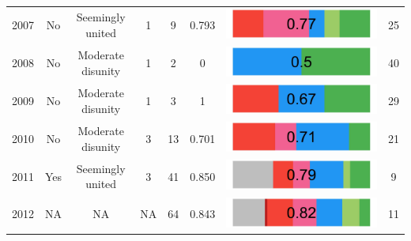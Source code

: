 \begin{landscape}
\begin{table}[!htbp]
\begin{tabular}{cccc|cccc}
2007  &     No      &                        Seemingly united   &                                      1 &                     9 &                     0.793  &        \includegraphics[width = 0.15\columnwidth]{img/ideo2007.jpg}   &         25   \\ 

2008  &     No    &                          Moderate disunity   &                                       1 &                    2 &                     0  &            \includegraphics[width = 0.15\columnwidth]{img/ideo2008.jpg} &           40  \\ 

2009  &     No      &                         Moderate disunity    &                                    1 &                     3 &                     1  &            \includegraphics[width = 0.15\columnwidth]{img/ideo2009.jpg}    &        29  \\ 

2010  &     No     &                          Moderate disunity  &                                      3 &                     13 &                    0.701  &         \includegraphics[width = 0.15\columnwidth]{img/ideo2010.jpg}  &         21   \\ 

2011  &     Yes     &                         Seemingly united  &                                      3 &                     41 &                    0.850    &          \includegraphics[width = 0.15\columnwidth]{img/ideo2011.jpg} &       9   \\ 

2012  &     NA     &                           NA   &                                   NA &                    64 &                    0.843    &          \includegraphics[width = 0.15\columnwidth]{img/ideo2012.jpg}  &      11   \\ 
 

\end{tabular}
\end{table}
\end{landscape}
